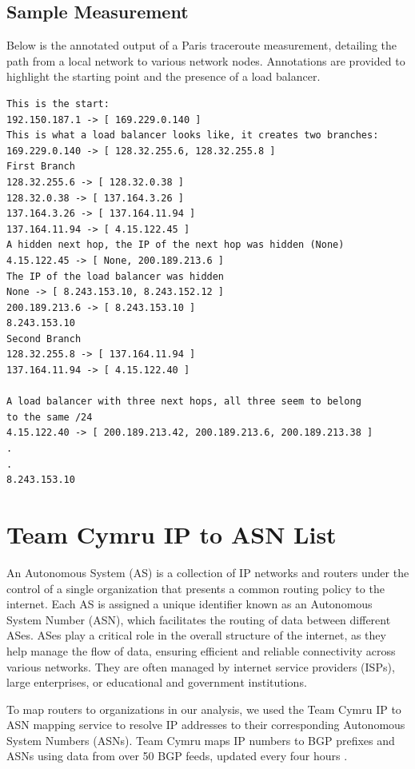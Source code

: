 \documentclass[12pt]{cwru_thesis}
\begin{document}
\subsection{Sample Measurement}
Below is the annotated output of a Paris traceroute measurement, detailing the path from a local network to various network nodes. Annotations are provided to highlight the starting point and the presence of a load balancer.
\begin{verbatim}
This is the start:
192.150.187.1 -> [ 169.229.0.140 ]
This is what a load balancer looks like, it creates two branches:
169.229.0.140 -> [ 128.32.255.6, 128.32.255.8 ]
First Branch
128.32.255.6 -> [ 128.32.0.38 ]
128.32.0.38 -> [ 137.164.3.26 ]
137.164.3.26 -> [ 137.164.11.94 ]
137.164.11.94 -> [ 4.15.122.45 ]
A hidden next hop, the IP of the next hop was hidden (None)
4.15.122.45 -> [ None, 200.189.213.6 ]
The IP of the load balancer was hidden
None -> [ 8.243.153.10, 8.243.152.12 ]
200.189.213.6 -> [ 8.243.153.10 ]
8.243.153.10
Second Branch 
128.32.255.8 -> [ 137.164.11.94 ]
137.164.11.94 -> [ 4.15.122.40 ]

A load balancer with three next hops, all three seem to belong
to the same /24
4.15.122.40 -> [ 200.189.213.42, 200.189.213.6, 200.189.213.38 ]
.
.
8.243.153.10
\end{verbatim}



\section{Team Cymru IP to ASN List}

An Autonomous System (AS) is a collection of IP networks and routers under the control of a single organization that presents a common routing policy to the internet. Each AS is assigned a unique identifier known as an Autonomous System Number (ASN), which facilitates the routing of data between different ASes. ASes play a critical role in the overall structure of the internet, as they help manage the flow of data, ensuring efficient and reliable connectivity across various networks. They are often managed by internet service providers (ISPs), large enterprises, or educational and government institutions.

To map routers to organizations in our analysis, we used the Team Cymru IP to ASN mapping service to resolve IP addresses to their corresponding Autonomous System Numbers (ASNs). Team Cymru maps IP numbers to BGP prefixes and ASNs using data from over 50 BGP feeds, updated every four hours  \cite{teamcymru2023ipasn}.\\  
\end{document}
